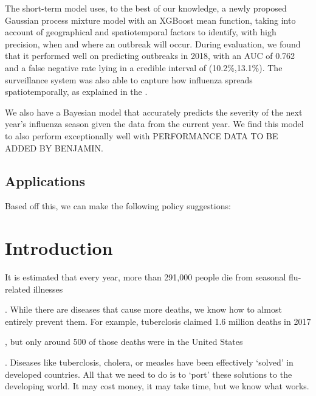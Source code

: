 \documentclass[letterpaper,10pt,english]{sphinxmanual}
\begin{document}
The short-term model uses, to the best of our knowledge, a newly proposed Gaussian process mixture model with an XGBoost mean function, taking into account of geographical and spatiotemporal factors to identify, with high precision, when and where an outbreak will occur. During evaluation, we found that it performed well on predicting outbreaks in 2018, with an AUC of 0.762 and a false negative rate lying in a credible interval of (10.2\%,13.1\%). The surveillance system was also able to capture how influenza spreads spatiotemporally, as explained in the .

We also have a Bayesian model that accurately predicts the severity of the next year’s influenza season given the data from the current year. We find this model to also perform exceptionally well with PERFORMANCE DATA TO BE ADDED BY BENJAMIN.


\subsection{Applications}
\label{\detokenize{executive_summary:applications}}
Based off this, we can make the following policy suggestions:


\section{Introduction}
\label{\detokenize{introduction:introduction}}\label{\detokenize{introduction::doc}}
It is estimated that every year, more than 291,000 people die from seasonal flu-related illnesses %
\begin{footnote}[1]\sphinxAtStartFootnote
{}
%
\end{footnote}. While there are diseases that cause more deaths, we know how to almost entirely prevent them. For example, tuberclosis claimed 1.6 million deaths in 2017 %
\begin{footnote}[2]\sphinxAtStartFootnote
{}
%
\end{footnote}, but only around 500 of those deaths were in the United States %
\begin{footnote}[3]\sphinxAtStartFootnote
{}
%
\end{footnote}. Diseases like tuberclosis, cholera, or measles have been effectively ‘solved’ in developed countries. All that we need to do is to ‘port’ these solutions to the developing world. It may cost money, it may take time, but we know what works.
\end{document}
